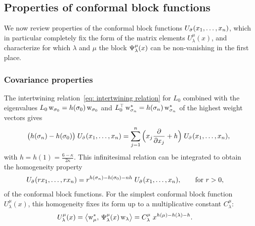 \documentclass[oneside,english]{amsart}
\numberwithin{equation}{section}
\numberwithin{figure}{section}
\theoremstyle{plain}
\theoremstyle{plain}
\theoremstyle{plain}
\theoremstyle{remark}
\theoremstyle{plain}
\theoremstyle{plain}
\theoremstyle{plain}
\theoremstyle{plain}
\theoremstyle{plain}
\theoremstyle{plain}
\theoremstyle{plain}
\theoremstyle{plain}
\newcommand{\red}[1]{{\color{red} #1}}
\begin{document}
\subsection{Properties of conformal block functions}

We now review properties of the conformal block functions $U_{\bar{\sigma}}(x_{1}, \ldots, x_{n})$,
which in particular completely fix the form of the matrix elements $U_{\lambda}^{\mu}(x)$,
and characterize for which $\lambda$ and $\mu$ the block $\Psi_{\lambda}^{\mu}(x)$
can be non-vanishing in the first place.

\subsubsection{\textbf{Covariance properties}}

The intertwining relation~\eqref{eq: intertwining relation} for $L_0$
combined with the eigenvalues $L_{0} \, \mathrm{w}_{\sigma_0} = h(\sigma_0)\,\mathrm{w}_{\sigma_0}$
and $L_{0}^\top \, \mathrm{w}^*_{\sigma_n} = h(\sigma_n)\,\mathrm{w}_{\sigma_n}^*$
of the highest weight vectors gives
\begin{align*}
\big( h(\sigma_n) - h(\sigma_0) \big) \; U_{\bar{\sigma}}(x_{1},\ldots,x_{n})
    = \sum_{j=1}^n \Big( x_j \frac{\partial}{\partial x_j}  + h \Big) \; U_{\bar{\sigma}}(x_{1},\ldots,x_{n}) ,
\end{align*}
with $h=h(1)=\frac{6-\kappa}{2\kappa}$.
This infinitesimal relation can be integrated to 
obtain the homogeneity property
\begin{align} \label{eq: homogeneity of conformal block functions}
U_{\bar{\sigma}}(rx_{1},\ldots,rx_{n})=\; & r^{h(\sigma_{n})-h(\sigma_{0})-nh}\;U_{\bar{\sigma}}(x_{1},\ldots,x_{n})
    , \qquad\text{for } r>0 , 
\end{align}
of the conformal block functions. For the simplest conformal block
function $U_{\lambda}^{\mu}(x)$, this homogeneity fixes its
form
up to a multiplicative constant $C_{\lambda}^{\mu}$: %
\begin{align} \label{eq: the general form of 3pt function}
U_{\lambda}^{\mu}(x) =  \left\langle  \mathrm{w}_{\mu}^{*} , \, \Psi_{\lambda}^{\mu}(x)\,\mathrm{w}_{\lambda}  \right\rangle =\; & C_{\lambda}^{\mu}\;x^{h(\mu)-h(\lambda)-h} .
\end{align}
\end{document}

